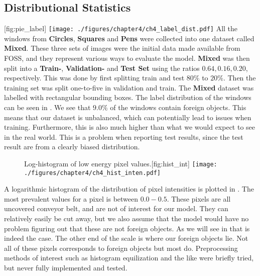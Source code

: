 \subsection{Distributional Statistics}
[fig:pie_label]
{\texttt{[image: ./figures/chapter4/ch4\_label\_dist.pdf]}}
All the windows from \textbf{Circles}, \textbf{Squares} and \textbf{Pens} were collected into one dataset called \textbf{Mixed}. 
These three sets of images were the initial data made available from FOSS, and they represent various ways to evaluate the model.
\textbf{Mixed} was then split into a \textbf{Train-}, \textbf{Validation-} and \textbf{Test Set} using the ratios $0.64, 0.16,0.20$, respectively. 
This was done by first splitting train and test $80\%$ to $20\%$. 
Then the training set was split one-to-five in validation and train.
The \textbf{Mixed} dataset was labelled with rectangular bounding boxes.
The label distribution of the windows can be seen in . 
We see that $9.0\%$ of the windows contain foreign objects.
This means that our dataset is unbalanced, which can potentially lead to issues when training.
Furthermore, this is also much higher than what we would expect to see in the real world.
This is a problem when reporting test results, since the test result are from a clearly biased distribution.
\vspace*{-0.5cm} 
\begin{figure}[h]
	\begin{sidecaption}{Log-histogram of low energy pixel values.}[fig:hist_int]
		\antimpjustification
		\centering
		\texttt{[image: ./figures/chapter4/ch4\_hist\_inten.pdf]}
	\end{sidecaption}
\end{figure}

A logarithmic histogram of the distribution of pixel intensities is plotted in . The most prevalent values for a pixel is between $0.0-0.5$. These pixels are all uncovered conveyor belt, and are not of interest for our model. 
They can relatively easily be cut away, but we also assume that the model would have no problem figuring out that these are not foreign objects. As we will see in  that is indeed the case.
The other end of the scale is where our foreign objects lie. Not all of these pixels corresponds to foreign objects but most do. 
Preprocessing methods of interest such as histogram equilization and the like were briefly tried, but never fully implemented and tested. 

